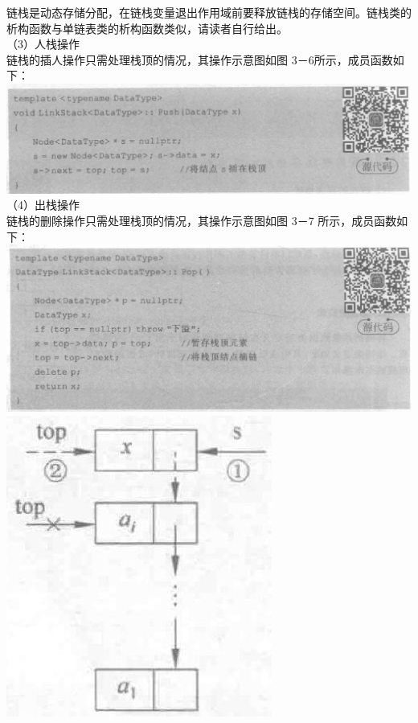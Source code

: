 \documentclass[10pt]{article}
\begin{document}
链栈是动态存储分配，在链栈变量退出作用域前要释放链栈的存储空间。链栈类的析构函数与单链表类的析构函数类似，请读者自行给出。\\
（3）人栈操作\\
链栈的插人操作只需处理栈顶的情况，其操作示意图如图 3－6所示，成员函数如下：\\
\includegraphics[max width=\textwidth, center]{2025_06_06_704745ea57b15b2333e5g-089(2)}\\
（4）出栈操作\\
链栈的删除操作只需处理栈顶的情况，其操作示意图如图 3－7 所示，成员函数如下：\\
\includegraphics[max width=\textwidth, center]{2025_06_06_704745ea57b15b2333e5g-089(1)}\\
\includegraphics[max width=\textwidth, center]{2025_06_06_704745ea57b15b2333e5g-089(4)}
\end{document}
